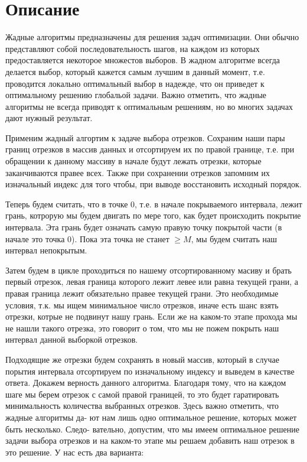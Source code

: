 \section{Описание}

Жадные алгоритмы предназначены для решения задач оптимизации.
Они обычно представляют собой последовательность шагов, на каждом из которых
предоставляется некоторое множестов выборов. В жадном алгоритме всегда делается
выбор, который кажется самым лучшим в данный момент, т.е. проводится локально
оптимальный выбор в надежде, что он приведет к оптимальному решению глобальой
задачи. Важно отметить, что жадные алгоритмы не всегда приводят к оптимальным
решениям, но во многих задачах дают нужный результат.

\par

Применим жадный алгортим к задаче выбора отрезков. Сохраним наши пары границ
отрезков в массив данных и отсортируем их по правой границе, т.е. при обращении
к данному массиву в начале будут лежать отрезки, которые заканчиваются правее
всех. Также при сохранении отрезков запомним их изначальный индекс для того
чтобы, при выводе восстановить исходный порядок.

\par

Теперь будем считать, что в точке 0, т.е. в начале покрываемого интервала, лежит
грань, котрорую мы будем двигать по мере того, как будет происходить покрытие
интервала. Эта грань будет означать самую правую точку покрытой части (в начале
это точка 0). Пока эта точка не станет $\geq M$, мы будем считать наш интервал
непокрытым.

\par

Затем будем в цикле проходиться по нашему отсортированному масиву и брать первый отрезок, левая граница которого лежит левее или равна текущей грани, а правая
граница лежит обязательно правее текущей грани. Это необходимые условия, т.к. мы
ищем минимальное число отрезков, иначе есть шанс взять отрезки, котрые не подвинут нашу грань. Если же на каком-то этапе прохода мы не нашли такого отрезка, это
говорит о том, что мы не пожем покрыть наш интервал данной выборкой отрезков.

\par 

Подходящие же отрезки будем сохранять в новый массив, который в случае порытия
интервала отсортируем по изначальному индексу и выведем в качестве ответа.
Докажем верность данного алгоритма. Благодаря тому, что на каждом шаге мы
берем отрезок с самой правой границей, то это будет гаратировать минимальность
количества выбранных отрезков. Здесь важно отметить, что жадные алгоритмы да-
ют нам лишь одно оптимальное решение, которых может быть несколько. Следо-
вательно, допустим, что мы имеем оптимальное решение задачи выбора отрезков и
на каком-то этапе мы решаем добавить наш отрезок в это решение. У нас есть два
варианта:

